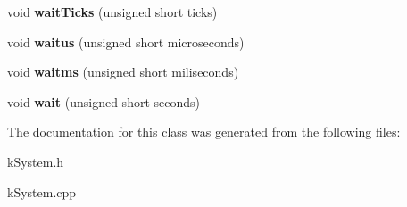 \begin{DoxyCompactItemize}
\item 
void {\bfseries wait\+Ticks} (unsigned short ticks)\hypertarget{classk__System_a6ef8777f96fa83396d70df2f9e5832b2}{}\label{classk__System_a6ef8777f96fa83396d70df2f9e5832b2}

\item 
void {\bfseries waitus} (unsigned short microseconds)\hypertarget{classk__System_afb2921801a6ada405b5d0d14a631e288}{}\label{classk__System_afb2921801a6ada405b5d0d14a631e288}

\item 
void {\bfseries waitms} (unsigned short miliseconds)\hypertarget{classk__System_ae583cbcb30dbd73be7f456841c1909cd}{}\label{classk__System_ae583cbcb30dbd73be7f456841c1909cd}

\item 
void {\bfseries wait} (unsigned short seconds)\hypertarget{classk__System_a631b827e6c7369e29564b0d811e39cec}{}\label{classk__System_a631b827e6c7369e29564b0d811e39cec}

\end{DoxyCompactItemize}


The documentation for this class was generated from the following files\+:\begin{DoxyCompactItemize}
\item 
k\+System.\+h\item 
k\+System.\+cpp\end{DoxyCompactItemize}
